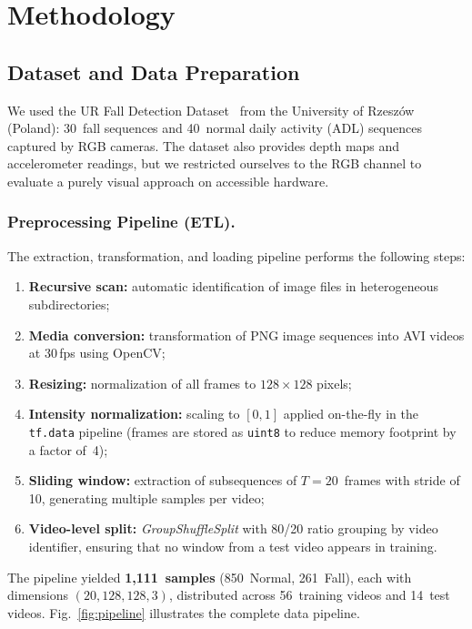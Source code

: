 \documentclass[runningheads]{llncs}
\begin{document}
\section{Methodology}

\subsection{Dataset and Data Preparation}

We used the UR Fall Detection Dataset~\cite{kwolek2014} from the University of Rzesz\'{o}w (Poland): 30~fall sequences and 40~normal daily activity (ADL) sequences captured by RGB cameras. The dataset also provides depth maps and accelerometer readings, but we restricted ourselves to the RGB channel to evaluate a purely visual approach on accessible hardware.

\subsubsection{Preprocessing Pipeline (ETL).}
The extraction, transformation, and loading pipeline performs the following steps:
\begin{enumerate}
  \item \textbf{Recursive scan:} automatic identification of image files in heterogeneous subdirectories;
  \item \textbf{Media conversion:} transformation of PNG image sequences into AVI videos at 30\,fps using OpenCV;
  \item \textbf{Resizing:} normalization of all frames to $128 \times 128$ pixels;
  \item \textbf{Intensity normalization:} scaling to $[0, 1]$ applied on-the-fly in the \texttt{tf.data} pipeline (frames are stored as \texttt{uint8} to reduce memory footprint by a factor of~4);
  \item \textbf{Sliding window:} extraction of subsequences of $T = 20$~frames with stride of 10, generating multiple samples per video;
  \item \textbf{Video-level split:} \textit{GroupShuffleSplit} with 80/20 ratio grouping by video identifier, ensuring that no window from a test video appears in training.
\end{enumerate}

The pipeline yielded \textbf{1,111~samples} (850~Normal, 261~Fall), each with dimensions $(20, 128, 128, 3)$, distributed across 56~training videos and 14~test videos. Fig.~\ref{fig:pipeline} illustrates the complete data pipeline.
\end{document}
